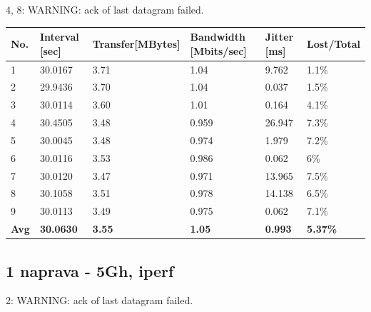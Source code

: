 \documentclass[11pt,a4paper,slovene]{article}
\begin{document}
4, 8: WARNING: ack of last datagram failed.

\begin{table}[H]
	\begin{adjustwidth}{-3cm}{-3cm}
	\centering
		\begin{tabular}{l|l|l|l|l|l}
		\hline
		\textbf{No.} & \textbf{Interval [sec]} & \textbf{Transfer[MBytes]} & \textbf{Bandwidth [Mbits/sec]} & \textbf{Jitter [ms]} & \textbf{Lost/Total} \\
     	\hline
     	1 & 30.0167 & 3.71 & 1.04 & 9.762 & 1.1\% \\
  		2 & 29.9436 & 3.70 & 1.04 & 0.037 & 1.5\% \\
  		3 & 30.0114 & 3.60 & 1.01 & 0.164 & 4.1\% \\
  		4 & 30.4505 & 3.48 & 0.959 & 26.947 & 7.3\% \\
  		5 & 30.0045 & 3.48 & 0.974 & 1.979 & 7.2\% \\
  		6 & 30.0116 & 3.53 & 0.986 & 0.062 & 6\% \\
  		7 & 30.0120 & 3.47 & 0.971 & 13.965 & 7.5\% \\
  		8 & 30.1058 & 3.51 & 0.978 & 14.138 & 6.5\% \\
  		9 & 30.0113 & 3.49 & 0.975 & 0.062 & 7.1\% \\
  		\hline
  		\textbf{Avg} & \textbf{30.0630} & \textbf{3.55} & \textbf{1.05} & \textbf{0.993} & \textbf{5.37\%} \\
  		\hline
    		\end{tabular}
    	\end{adjustwidth}
\end{table}

\subsection{1 naprava - 5Gh, iperf}

2: WARNING: ack of last datagram failed.
\end{document}
